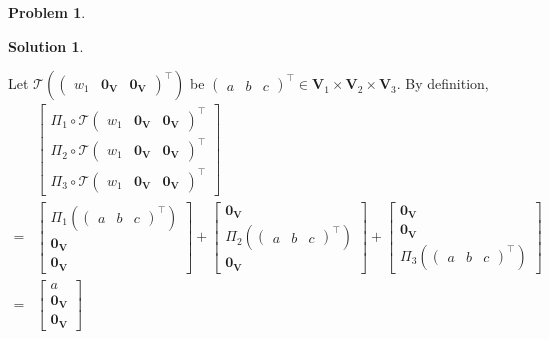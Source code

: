\documentclass{article}
\theoremstyle{definition}
\newtheorem*{prob*}{Problem}
\newtheorem*{sln*}{Solution}
\newcommand{\V}{\mathbf{V}}
\newcommand{\T}{\mathcal{T}}
\begin{document}
\begin{prob*}
\begin{sln*}
\begin{enumerate}
\begin{enumerate}
			Let $\T\left(\begin{pmatrix}
			w_1&\mathbf{0}_\V&\mathbf{0}_\V
			\end{pmatrix}^\top\right)$ be $\begin{pmatrix}
			a&b&c
			\end{pmatrix}^\top\in \V_1\times\V_2\times\V_3$. By definition,
			\begin{align*}
			&\begin{bmatrix}
			\Pi_1 \circ \T\begin{pmatrix} w_1 & \mathbf{0}_\V & \mathbf{0}_\V \end{pmatrix}^\top\\
			\Pi_2 \circ \T\begin{pmatrix} w_1 & \mathbf{0}_\V & \mathbf{0}_\V \end{pmatrix}^\top\\
			\Pi_3 \circ \T\begin{pmatrix} w_1 & \mathbf{0}_\V & \mathbf{0}_\V \end{pmatrix}^\top
			\end{bmatrix}\\ =
			&\begin{bmatrix}
			\Pi_1 \left(\begin{pmatrix}
			a&b&c
			\end{pmatrix}^\top\right)\\
			\mathbf{0}_\V\\
			\mathbf{0}_\V
			\end{bmatrix} +
			 \begin{bmatrix}
			 \mathbf{0}_\V\\
			 \Pi_2 \left(\begin{pmatrix}
			 a&b&c
			 \end{pmatrix}^\top\right)\\
			 \mathbf{0}_\V
			 \end{bmatrix} + 
			 \begin{bmatrix}
			 \mathbf{0}_\V\\
			 \mathbf{0}_\V\\
			 \Pi_3 \left(\begin{pmatrix}
			 a&b&c
			 \end{pmatrix}^\top\right)
			 \end{bmatrix}\\
			 =
			 &\begin{bmatrix}
			 a\\
			 \mathbf{0}_\V\\
			 \mathbf{0}_\V
			 \end{bmatrix} 

\end{align*}
\end{enumerate}
\end{enumerate}
\end{sln*}
\end{prob*}
\end{document}
